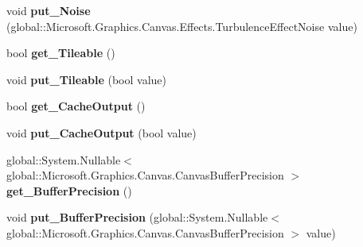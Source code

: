 \begin{DoxyCompactItemize}
\mbox{\label{class_microsoft_1_1_graphics_1_1_canvas_1_1_effects_1_1_turbulence_effect_a0439ce3457931371a7e49de7dcd7a919}} 
void {\bfseries put\+\_\+\+Noise} (global\+::\+Microsoft.\+Graphics.\+Canvas.\+Effects.\+Turbulence\+Effect\+Noise value)
\item 
\mbox{\label{class_microsoft_1_1_graphics_1_1_canvas_1_1_effects_1_1_turbulence_effect_af2568a4c8c4b6ac6a1cd5dd2a3ed936c}} 
bool {\bfseries get\+\_\+\+Tileable} ()
\item 
\mbox{\label{class_microsoft_1_1_graphics_1_1_canvas_1_1_effects_1_1_turbulence_effect_a8588799f1b33e53343293169f398a24f}} 
void {\bfseries put\+\_\+\+Tileable} (bool value)
\item 
\mbox{\label{class_microsoft_1_1_graphics_1_1_canvas_1_1_effects_1_1_turbulence_effect_a2c596cbdbfb7b80b475624a4c9dce0e8}} 
bool {\bfseries get\+\_\+\+Cache\+Output} ()
\item 
\mbox{\label{class_microsoft_1_1_graphics_1_1_canvas_1_1_effects_1_1_turbulence_effect_a32c398e77df6916280569b73de4cbf02}} 
void {\bfseries put\+\_\+\+Cache\+Output} (bool value)
\item 
\mbox{\label{class_microsoft_1_1_graphics_1_1_canvas_1_1_effects_1_1_turbulence_effect_aa0fb0f26319e287cf2cc4971185f1c90}} 
global\+::\+System.\+Nullable$<$ global\+::\+Microsoft.\+Graphics.\+Canvas.\+Canvas\+Buffer\+Precision $>$ {\bfseries get\+\_\+\+Buffer\+Precision} ()
\item 
\mbox{\label{class_microsoft_1_1_graphics_1_1_canvas_1_1_effects_1_1_turbulence_effect_af5cfe0ab61f3b28ea69b35d8c65fb075}} 
void {\bfseries put\+\_\+\+Buffer\+Precision} (global\+::\+System.\+Nullable$<$ global\+::\+Microsoft.\+Graphics.\+Canvas.\+Canvas\+Buffer\+Precision $>$ value)

\end{DoxyCompactItemize}
